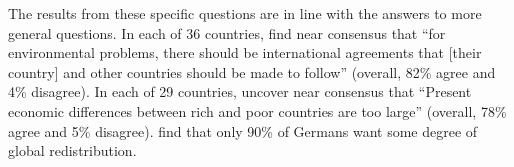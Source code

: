 The results from these specific questions are in line with the answers to more general questions. In each of 36 countries, \citet{issp_international_2010} find near consensus that ``for environmental problems, there should be international agreements that [their country] and other countries should be made to follow'' (overall, 82\% agree and 4\% disagree). %
In each of 29 countries, \citet{issp_international_2019} uncover near consensus that ``Present economic differences between rich and poor countries are too large'' (overall, 78\% agree and 5\% disagree). \citet{fehr_your_2022} find that only 90\% of Germans want some degree of global redistribution. %

